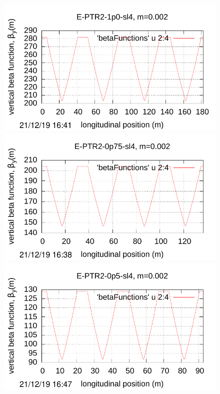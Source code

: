 \documentclass[]{article}
\begin{document}
%
%
\begin{figure}[htbp]
\hspace{-0.6cm}
\begin{minipage}[b]{0.45\linewidth}
\centering
\includegraphics[scale=0.67]{pdf/E-PTR2-1p0-COSY-sl4-Fig_II-11-ETEAPOT.pdf}
\includegraphics[scale=0.67]{pdf/E-PTR2-0p75-COSY-sl4-Fig_II-11-ETEAPOT.pdf}
\includegraphics[scale=0.67]{pdf/E-PTR2-0p5-COSY-sl4-Fig_II-11-ETEAPOT.pdf}

\end{minipage}
\end{figure}
\end{document}
